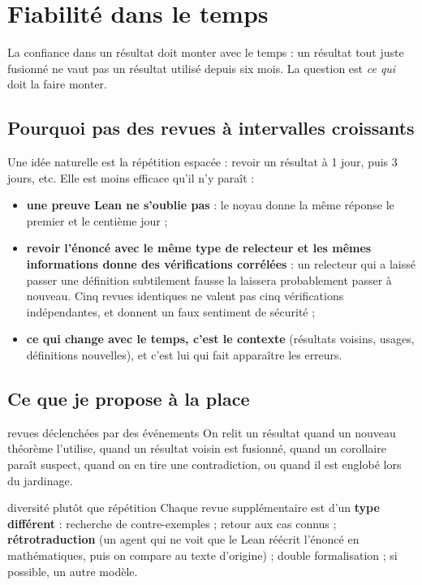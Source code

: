 \documentclass[11pt,a4paper]{article}
\begin{document}
\section{Fiabilité dans le temps}\label{sec:fiabilite}

La confiance dans un résultat doit monter avec le temps : un résultat tout juste fusionné ne vaut pas un
résultat utilisé depuis six mois. La question est \emph{ce qui} doit la faire monter.

\subsection{Pourquoi pas des revues à intervalles croissants}

Une idée naturelle est la répétition espacée : revoir un résultat à 1 jour, puis 3 jours, etc. Elle est
moins efficace qu'il n'y paraît :
\begin{itemize}
\item \textbf{une preuve Lean ne s'oublie pas} : le noyau donne la même réponse le premier et le centième jour ;
\item \textbf{revoir l'énoncé avec le même type de relecteur et les mêmes informations donne des
  vérifications corrélées} : un relecteur qui a laissé passer une définition subtilement fausse la
  laissera probablement passer à nouveau. Cinq revues identiques ne valent pas cinq vérifications
  indépendantes, et donnent un faux sentiment de sécurité ;
\item \textbf{ce qui change avec le temps, c'est le contexte} (résultats voisins, usages, définitions
  nouvelles), et c'est lui qui fait apparaître les erreurs.
\end{itemize}

\subsection{Ce que je propose à la place}

\begin{regle}{revues déclenchées par des événements}
On relit un résultat quand un nouveau théorème l'utilise, quand un résultat voisin est fusionné, quand un
corollaire paraît suspect, quand on en tire une contradiction, ou quand il est englobé lors du jardinage.
\end{regle}

\begin{regle}{diversité plutôt que répétition}
Chaque revue supplémentaire est d'un \textbf{type différent} :
recherche de contre-exemples ; retour aux cas connus ;
\textbf{rétrotraduction} (un agent qui ne voit que le Lean réécrit l'énoncé en mathématiques, puis on
compare au texte d'origine) ; double formalisation ; si possible, un autre modèle.
\end{regle}
\end{document}
